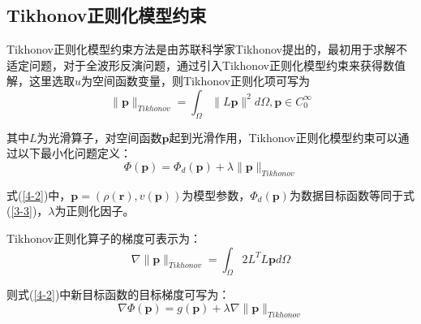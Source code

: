 \documentclass[12pt]{article}
\begin{document}
\subsection{Tikhonov正则化模型约束}
Tikhonov正则化模型约束方法是由苏联科学家Tikhonov提出的，最初用于求解不适定问题，对于全波形反演问题，通过引入Tikhonov正则化模型约束来获得数值解，这里选取$u$为空间函数变量，则Tikhonov正则化项可写为
\begin{equation}\label{4-1}
\parallel \boldsymbol{p} \parallel_{Tikhonov}=\int_{\Omega}\parallel L \boldsymbol{p} \parallel^2d \Omega,\boldsymbol{p} \in C_0^{\infty}
\end{equation}
\par
其中$L$为光滑算子，对空间函数$\boldsymbol{p}$起到光滑作用，Tikhonov正则化模型约束可以通过以下最小化问题定义：
\begin{equation}\label{4-2}
\Phi(\boldsymbol{p})=\Phi_d(\boldsymbol{p})+\lambda \parallel \boldsymbol{p} \parallel_{Tikhonov}
\end{equation}
\par
式(\ref{4-2})中，$\boldsymbol{p}=(\rho(\boldsymbol{r}),v(\boldsymbol{p}))$为模型参数，$\Phi_d(\boldsymbol{p})$为数据目标函数等同于式(\ref{3-3})，$\lambda$为正则化因子。
\par
Tikhonov正则化算子的梯度可表示为：
\begin{equation}\label{4-3}
\nabla\parallel \boldsymbol{p} \parallel_{Tikhonov}=\int_{\Omega} 2 L^T L \boldsymbol{p} d \Omega
\end{equation}
\par
则式(\ref{4-2})中新目标函数的目标梯度可写为：
\begin{equation}\label{4-4}
\nabla \Phi(\boldsymbol{p})=g(\boldsymbol{p})+\lambda \nabla \parallel \boldsymbol{p} \parallel_{Tikhonov}
\end{equation}
\end{document}
